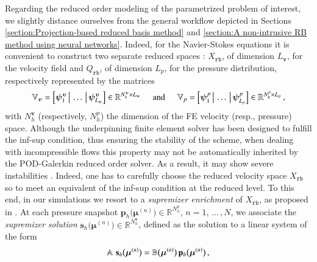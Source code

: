 \documentclass[longtitle]{elsarticle}
\numberwithin{equation}{section}
\theoremstyle{theorem}
\theoremstyle{definition}
\theoremstyle{remark}
\theoremstyle{proposition}
\numberwithin{figure}{section}
\newcommand{\bg}[1]{\boldsymbol{#1}}
\begin{document}
		Regarding the reduced order modeling of the parametrized problem of interest, we slightly distance ourselves from the general workflow depicted in Sections \ref{section:Projection-based reduced basis method} and \ref{section:A non-intrusive RB method using neural networks}. Indeed, for the Navier-Stokes equations it is convenient to construct two separate reduced spaces \cite{Bal14, Chen17, QMN15}: $X_{\texttt{rb}}$, of dimension $L_{\bg{v}}$, for the velocity field and $Q_{\texttt{rb}}$, of dimension $L_p$, for the pressure distribution, respectively represented by the matrices 
		\begin{equation*}
			\mathbb{V}_{\bg{v}} = \left[ \bg{\psi}_1^{\bg{v}} \, \big| \, \ldots \, \big| \, \bg{\psi}_{L_{\bg{v}}}^{\bg{v}} \right] \in \mathbb{R}^{N_h^{\bg{v}} \times L_{\bg{v}}} \hspace*{0.5cm} \text{and} \hspace*{0.5cm} \mathbb{V}_p = \left[ \bg{\psi}_1^p \, \big| \, \ldots \, \big| \, \bg{\psi}_{L_p}^p \right] \in \mathbb{R}^{N_h^p \times L_p} \, ,
		\end{equation*}
		with $N_h^{\bg{v}}$ (respectively, $N_h^p$) the dimension of the FE velocity (resp., pressure) space. Although the underpinning finite element solver has been designed to fulfill the inf-sup condition, thus ensuring the stability of the scheme, when dealing with incompressible flows this property may not be automatically inherited by the POD-Galerkin reduced order solver. As a result, it may show severe instabilities \cite{Bur06}. Indeed, one has to carefully choose the reduced velocity space $X_{\texttt{rb}}$ so to meet an equivalent of the inf-sup condition at the reduced level. To this end, in our simulations we resort to a \emph{supremizer enrichment} of $X_{\texttt{rb}}$, as proposed in \cite{Bal14}. At each pressure snapshot $\mathbf{p}_h \big( \bg{\mu}^{(n)} \big) \in \mathbb{R}^{N_h^p}$, $n = 1, \, \ldots \, , N$, we associate the \emph{supremizer solution} $\mathbf{s}_h \big( \bg{\mu}^{(n)} \big) \in \mathbb{R}^{N_h^{\bg{v}}}$, defined as the solution to a linear system of the form
		\vspace*{-0.1cm}
		\begin{equation*}
			\mathbb{A} \,\, \mathbf{s}_h \big( \bg{\mu}^{(n)} \big) = \mathbb{B} \big( \bg{\mu}^{(n)} \big) \, \mathbf{p}_h \big( \bg{\mu}^{(n)} \big) \, ,
			\vspace*{-0.1cm}
		\end{equation*}
\end{document}
